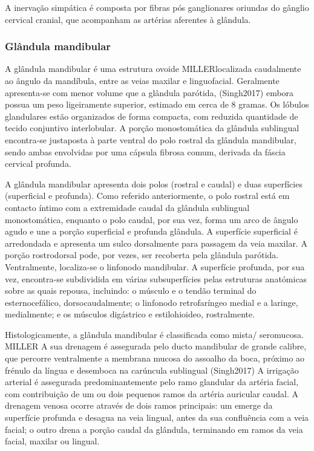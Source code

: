 A inervação simpática é composta por fibras pós ganglionares oriundas do gânglio cervical cranial, que acompanham as artérias aferentes à glândula.\cite{Singh2017}

\subsubsection{Glândula mandibular}

A glândula mandibular é uma estrutura ovoide MILLER\cite{Singh2017}localizada caudalmente ao ângulo da mandíbula, entre as veias maxilar e linguofacial. Geralmente apresenta-se com menor volume que a glândula parótida, (Singh2017) embora possua um peso ligeiramente superior, estimado em cerca de 8 gramas. Os lóbulos glandulares estão organizados de forma compacta, com reduzida quantidade de tecido conjuntivo interlobular. A porção monostomática da glândula sublingual encontra-se justaposta à parte ventral do polo rostral da glândula mandibular, sendo ambas envolvidas por uma cápsula fibrosa comum, derivada da fáscia cervical profunda.


A glândula mandibular apresenta dois polos (rostral e caudal) e duas superfícies (superficial e profunda). Como referido anteriormente, o polo rostral está em contacto íntimo com a extremidade caudal da glândula sublingual monostomática, enquanto o polo caudal, por sua vez, forma um arco de ângulo agudo e une a porção superficial e profunda glândula. A superfície superficial é arredondada e apresenta um sulco dorsalmente para passagem da veia maxilar. A porção rostrodorsal pode, por vezes, ser recoberta pela glândula parótida. Ventralmente, localiza-se o linfonodo mandibular. A superfície profunda, por sua vez, encontra-se subdividida em várias subsuperfícies pelas estruturas anatómicas sobre as quais repousa, incluindo: o músculo e o tendão terminal do esternocefálico, dorsocaudalmente; o linfonodo retrofaríngeo medial e a laringe, medialmente; e os músculos digástrico e estilohioideo, rostralmente.


Histologicamente, a glândula mandibular é classificada como mista/ seromucosa. MILLER \cite{Singh2017}
A sua drenagem é assegurada pelo ducto mandibular de grande calibre, que percorre ventralmente a membrana mucosa do assoalho  da boca, próximo ao frénulo da língua e desemboca na carúncula sublingual (Singh2017)
A irrigação arterial é assegurada predominantemente pelo ramo glandular da artéria facial, com contribuição de um ou dois pequenos ramos da artéria auricular caudal. A drenagem venosa ocorre através de dois ramos principais: um emerge da superfície profunda e desagua na veia lingual, antes da sua confluência com a veia facial; o outro drena a porção caudal da glândula, terminando em ramos da veia facial, maxilar ou lingual.


